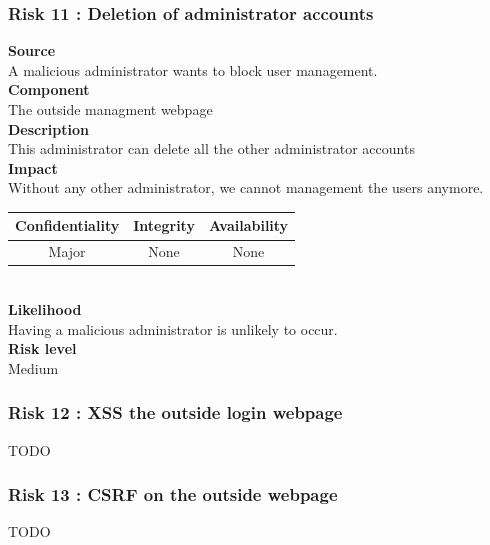 \documentclass[a4paper,11pt]{article}
\begin{document}
\subsubsection{Risk 11 : Deletion of administrator accounts }
\textbf{Source} \\A malicious administrator wants to block user management.\\
\textbf{Component} \\The outside managment webpage\\
\textbf{Description}\\This administrator can delete all the other administrator accounts \\
\textbf{Impact}\\
Without any other administrator, we cannot management the users anymore.\\
\begin{tabular}{|c|c|c|}
\hline
Confidentiality & Integrity & Availability \\
\hline
Major & None & None \\
\hline
\end{tabular}\\
\textbf{Likelihood}\\ Having a malicious administrator is unlikely to occur.\\
\textbf{Risk level}\\Medium\\

\subsubsection{Risk 12 : XSS the outside login webpage}
TODO
\subsubsection{Risk 13 : CSRF on the outside webpage}
TODO
\end{document}
